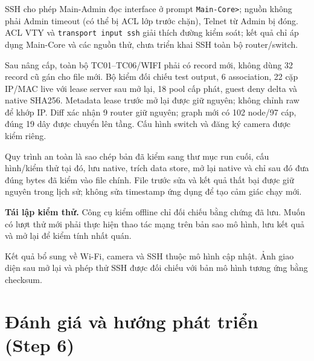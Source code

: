 \documentclass[
  11pt,
]{article}
\begin{document}
SSH cho phép Main-Admin đọc interface ở prompt \texttt{Main-Core>}; nguồn không phải Admin timeout (có thể bị ACL lớp trước chặn), Telnet từ Admin bị đóng. ACL VTY và \texttt{transport input ssh} giải thích đường kiểm soát; kết quả chỉ áp dụng Main-Core và các nguồn thử, chưa triển khai SSH toàn bộ router/switch.

Sau nâng cấp, toàn bộ TC01--TC06/WIFI phải có record mới, không dùng 32 record cũ gán cho file mới. Bộ kiểm đối chiếu test output, 6 association, 22 cặp IP/MAC live với lease server sau mở lại, 18 pool cấp phát, guest deny delta và native SHA256. Metadata lease trước mở lại được giữ nguyên; không chỉnh raw để khớp IP. Diff xác nhận 9 router giữ nguyên; graph mới có 102 node/97 cáp, đúng 19 dây được chuyển lên tầng. Cấu hình switch và đăng ký camera được kiểm riêng.

Quy trình an toàn là sao chép bản đã kiểm sang thư mục run cuối, cấu hình/kiểm thử tại đó, lưu native, trích data store, mở lại native và chỉ sau đó đưa đúng bytes đã kiểm vào file chính. File trước sửa và kết quả thất bại được giữ nguyên trong lịch sử; không sửa timestamp ứng dụng để tạo cảm giác chạy mới.

\textbf{Tái lập kiểm thử.} Công cụ kiểm offline chỉ đối chiếu bằng chứng đã lưu. Muốn có lượt thử mới phải thực hiện thao tác mạng trên bản sao mô hình, lưu kết quả và mở lại để kiểm tính nhất quán.

Kết quả bổ sung về Wi-Fi, camera và SSH thuộc mô hình cập nhật. Ảnh giao diện sau mở lại và phép thử SSH được đối chiếu với bản mô hình tương ứng bằng checksum.

\clearpage
\section{Đánh giá và hướng phát triển (Step 6)}
\end{document}
